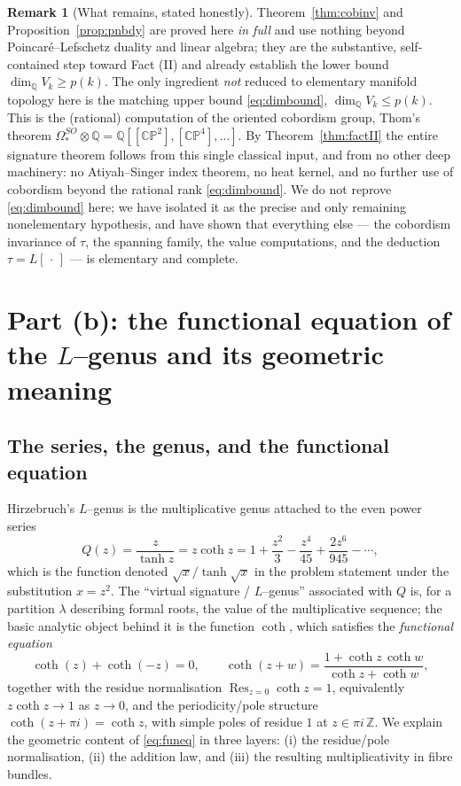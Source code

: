 \documentclass[12pt]{article}
\theoremstyle{definition}
\newtheorem{remark}{Remark}
\begin{document}
\begin{remark}[What remains, stated honestly]\label{rem:honest}
Theorem~\ref{thm:cobinv} and Proposition~\ref{prop:pnbdy} are proved here \emph{in full}
and use nothing beyond Poincar\'e--Lefschetz duality and linear algebra; they are the
substantive, self-contained step toward Fact (II) and already establish the lower bound
$\dim_{\mathbb Q}V_k\ge p(k)$.  The only ingredient \emph{not} reduced to elementary
manifold topology here is the matching upper bound \eqref{eq:dimbound},
$\dim_{\mathbb Q}V_k\le p(k)$.  This is the (rational) computation of the oriented
cobordism group, Thom's theorem
$\Omega^{SO}_\ast\otimes\mathbb Q=\mathbb Q[[\mathbb{CP}^2],[\mathbb{CP}^4],\dots]$.
By Theorem~\ref{thm:factII} the entire signature theorem follows from this single
classical input, and from no other deep machinery: no Atiyah--Singer index theorem, no
heat kernel, and no further use of cobordism beyond the rational rank
\eqref{eq:dimbound}.  We do not reprove \eqref{eq:dimbound} here; we have isolated it as
the precise and only remaining nonelementary hypothesis, and have shown that everything
else --- the cobordism invariance of $\tau$, the spanning family, the value
computations, and the deduction $\tau=L[\,\cdot\,]$ --- is elementary and complete.
\end{remark}

\bigskip

\section{Part (b): the functional equation of the $L$--genus and its geometric
meaning}\label{sec:partb}

\subsection*{The series, the genus, and the functional equation}

Hirzebruch's $L$--genus is the multiplicative genus attached to the even power series
\[
Q(z)=\frac{z}{\tanh z}=z\coth z
=1+\frac{z^2}{3}-\frac{z^4}{45}+\frac{2z^6}{945}-\cdots ,
\tag{10}\label{eq:Qseries}
\]
which is the function denoted $\sqrt{x}/\tanh\sqrt{x}$ in the problem statement under the
substitution $x=z^2$.  The ``virtual signature / $L$--genus'' associated with $Q$ is, for
a partition $\lambda$ describing formal roots, the value of the multiplicative sequence;
the basic analytic object behind it is the function $\coth$, which satisfies the
\emph{functional equation}
\[
\coth(z)+\coth(-z)=0,\qquad
\coth(z+w)=\frac{1+\coth z\,\coth w}{\coth z+\coth w},
\tag{11}\label{eq:funeq}
\]
together with the residue normalisation $\operatorname{Res}_{z=0}\coth z=1$, equivalently
$z\coth z\to 1$ as $z\to 0$, and the periodicity/pole structure
$\coth(z+\pi i)=\coth z$, with simple poles of residue $1$ at $z\in\pi i\,\mathbb Z$.  We
explain the geometric content of \eqref{eq:funeq} in three layers: (i) the residue/pole
normalisation, (ii) the addition law, and (iii) the resulting multiplicativity in fibre
bundles.
\end{document}
